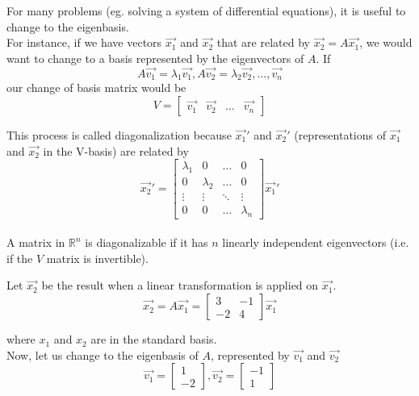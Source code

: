 \begin{enumerate}
\bigskip

\begin{adjustwidth}{-20pt}{0pt}

For many problems (eg. solving a system of differential equations), it is useful to change to the eigenbasis. \\
For instance, if we have vectors $\vec{x_1}$ and $\vec{x_2}$ that are related by $\vec{x_2} = A \vec{x_1}$, we would want to change to a basis represented by the eigenvectors of $A$.
If $$A \vec{v_1} = \lambda_1 \vec{v_1}, A \vec{v_2} = \lambda_2 \vec{v_2}, \dots, \vec{v_n} $$
our change of basis matrix would be
$$ V =
\begin{bmatrix}
\vec{v_1} & \vec{v_2} & \dots & \vec{v_n}
\end{bmatrix}
$$

This process is called diagonalization because $\vec{x_1}'$ and $\vec{x_2}'$ (representations of $\vec{x_1}$ and $\vec{x_2}$ in the V-basis) are related by
$$ \vec{x_2}' =
\begin{bmatrix}
\lambda_1 & 0 & \dots & 0 \\
0 & \lambda_2 & \dots & 0 \\
\vdots & \vdots & \ddots & \vdots \\
0 & 0 & \dots & \lambda_n
\end{bmatrix} \vec{x_1}'
$$ \\
A matrix in $\mathbb{R}^{n}$ is diagonalizable if it has $n$ linearly independent eigenvectors (i.e. if the $V$ matrix is invertible).

\end{adjustwidth}

\bigskip

\qitem Let $\vec{x_2}$ be the result when a linear transformation is applied on $\vec{x_1}$.
$$\vec{x_2} = A \vec{x_1} =
\begin{bmatrix}
3 & -1 \\
-2 & 4
\end{bmatrix}
\vec{x_1}
$$

where $x_1$ and $x_2$ are in the standard basis. \\
Now, let us change to the eigenbasis of $A$, represented by $\vec{v_1}$ and $\vec{v_2}$
$$
\vec{v_1} =
\begin{bmatrix}
1 \\
-2
\end{bmatrix},
\vec{v_2} =
\begin{bmatrix}
-1 \\
1
\end{bmatrix}
$$


\end{enumerate}
